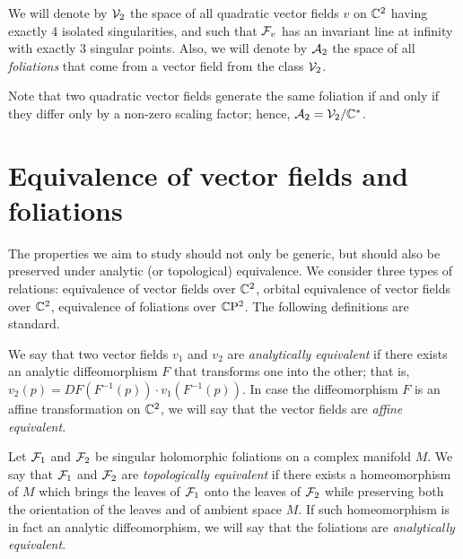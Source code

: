 \documentclass[phd,tocprelim]{cornell}
\begin{document}
\begin{definition}\label{def:classesV2A2}
 We will denote by $\mathcal{V}_2$ the space of all quadratic vector fields $v$ on $\mathbb{C}^2$ having exactly 4 isolated singularities, and such that $\mathcal{F}_v$ has an invariant line at infinity with exactly 3 singular points. Also, we will denote by $\mathcal{A}_2$ the space of all \textit{foliations} that come from a vector field from the class $\mathcal{V}_2$.
\end{definition}

Note that two quadratic vector fields generate the same foliation if and only if they differ only by a non-zero scaling factor; hence, $\mathcal{A}_2=\mathcal{V}_2/\mathbb{C}^*$.




\section{Equivalence of vector fields and foliations}

The properties we aim to study should not only be generic, but should also be preserved under  analytic (or topological) equivalence. We consider three types of relations: equivalence of vector fields over $\mathbb{C}^2$, orbital equivalence of vector fields over $\mathbb{C}^2$, equivalence of foliations over $\mathbb{C}\mathrm{P}^2$. The following definitions are standard.

\begin{definition}\label{def:analyticEqVectorFields}
 We say that two vector fields $v_1$ and $v_2$ are \textit{analytically equivalent} if there exists an analytic diffeomorphism $F$ 
 that transforms one into the other; that is, $v_2(p)=DF(F^{-1}(p))\cdot v_1(F^{-1}(p))$. In case the diffeomorphism $F$ is an affine transformation on $\mathbb{C}^2$, we will say that the vector fields are \textit{affine equivalent}. 
\end{definition}

\begin{definition}\label{def:analyticEqFoliations}
 Let $\mathcal{F}_1$ and $\mathcal{F}_2$ be singular holomorphic foliations on a complex manifold $M$. We say that $\mathcal{F}_1$ and $\mathcal{F}_2$ are \textit{topologically equivalent} if there exists a homeomorphism  of $M$ which brings the leaves of $\mathcal{F}_1$ onto the leaves of $\mathcal{F}_2$ while preserving both the orientation of the leaves and of ambient space $M$. If such homeomorphism is in fact an analytic diffeomorphism, we will say that the foliations are \textit{analytically equivalent}.
\end{definition}
\end{document}
